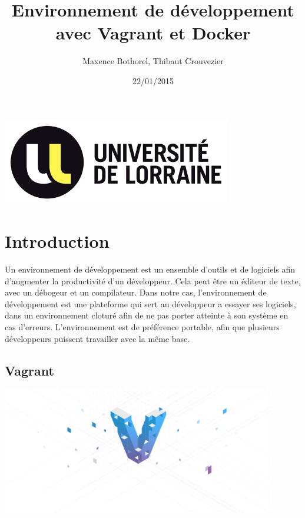 \documentclass[12pt,a4paper]{article}
\title{Environnement de développement avec Vagrant et Docker}
\author{Maxence Bothorel, Thibaut Crouvezier}
\date{22/01/2015}
\begin{document}
\maketitle{}

\begin{center}
  \includegraphics[width=10cm]{images_rapport/univ_logo.jpg}
\end{center}

\newpage{}

\tableofcontents{}

\newpage{}

\section{Introduction}
Un environnement de développement est un ensemble d'outils et de logiciels afin d'augmenter la productivité d'un développeur. Cela peut être un éditeur de texte, avec un débogeur et un compilateur. Dans notre cas, l'environnement de développement est une plateforme qui sert au développeur a essayer ses logiciels, dans un environnement cloturé afin de ne pas porter atteinte à son système en cas d'erreurs. L'environnement est de préférence portable, afin que plusieurs développeurs puissent travailler avec la même base.

\subsection{Vagrant}
\begin{center}
  \includegraphics[width=12cm]{images_rapport/vagrant_logo.jpg}
\end{center}
\end{document}
